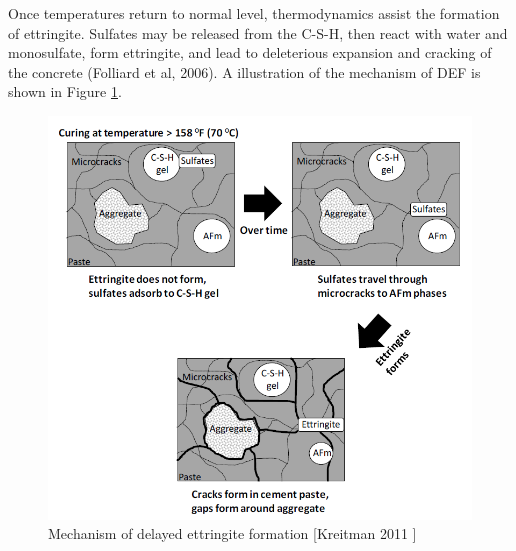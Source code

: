 
Once temperatures return to normal level, thermodynamics assist the formation of ettringite. Sulfates may be released from the C-S-H, then react with water and monosulfate, form ettringite, and lead to deleterious expansion and cracking of the concrete (Folliard et al, 2006\cite{Folliard}). A illustration of the mechanism of DEF is shown in Figure \ref{DEF_mechanism}.

 \begin{figure}[ht]
 \centering
 \includegraphics[width=.8\linewidth]{Reference/Kreitman2.png}
   \caption{Mechanism of delayed ettringite formation [Kreitman 2011 \cite{Kreitman}]}
   \label{DEF_mechanism}
 \end{figure}
